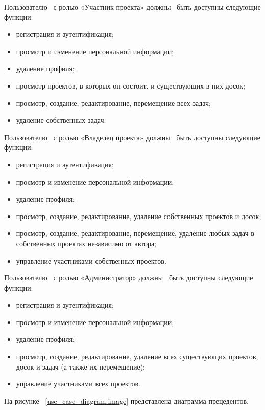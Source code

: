 Пользователю  с ролью «Участник проекта» должны  быть доступны следующие функции:
\begin{itemize}
	\item регистрация и аутентификация;
	\item просмотр и изменение персональной информации;
	\item удаление профиля;
	\item просмотр проектов, в которых он состоит, и существующих в них досок;
	\item просмотр, создание, редактирование, перемещение всех задач;
	\item удаление собственных задач.
\end{itemize}

Пользователю  с ролью «Владелец проекта» должны  быть доступны следующие функции:
\begin{itemize}
	\item регистрация и аутентификация;
	\item просмотр и изменение персональной информации;
	\item удаление профиля;
	\item просмотр, создание, редактирование, удаление собственных проектов и досок;
	\item просмотр, создание, редактирование, перемещение, удаление любых задач в собственных проектах независимо от автора;
	\item управление участниками собственных проектов.
\end{itemize}

Пользователю  с ролью «Администратор» должны  быть доступны следующие функции:
\begin{itemize}
	\item регистрация и аутентификация;
	\item просмотр и изменение персональной информации;
	\item удаление профиля;
	\item просмотр, создание, редактирование, удаление всех существующих проектов, досок и задач (а также их перемещение);
	\item управление участниками всех проектов.
\end{itemize}

На рисунке ~\ref{use_case_diagram:image} представлена диаграмма прецедентов.

